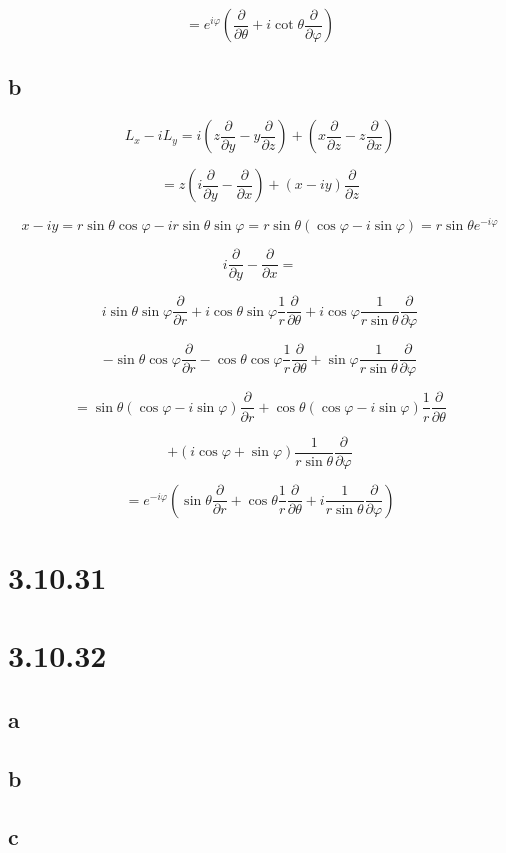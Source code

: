 \documentclass[12pt]{article}
\begin{document}
\[
    = e^{i \varphi} \left(\frac{\partial}{\partial \theta} + i \cot{\theta}\frac{\partial}{\partial \varphi}\right)
\]

\subsection{b}

\[
    L_x - i L_y = i \left(z \frac{\partial}{\partial y} - y \frac{\partial}{\partial z}\right) + \left(x \frac{\partial}{\partial z} - z \frac{\partial}{\partial x}\right)
\]

\[
    = z \left(i \frac{\partial}{\partial y} - \frac{\partial}{\partial x}\right)  + \left(x - i y\right)  \frac{\partial}{\partial z}
\]

\[
    x - i y = r \sin{\theta} \cos{\varphi} - i r \sin{\theta} \sin{\varphi} = r \sin{\theta} \left(\cos{\varphi} - i \sin{\varphi}\right) = r \sin{\theta} e^{-i \varphi}
\]

\[
    i \frac{\partial}{\partial y} - \frac{\partial}{\partial x} =
\]

\[
    i  \sin{\theta} \sin{\varphi} \frac{\partial}{\partial r} + i \cos{\theta} \sin{\varphi} \frac{1}{r} \frac{\partial}{\partial \theta} + i \cos{\varphi} \frac{1}{r \sin{\theta}} \frac{\partial}{\partial \varphi}
\]

\[
    - \sin{\theta} \cos{\varphi} \frac{\partial}{\partial r} - \cos{\theta} \cos{\varphi} \frac{1}{r} \frac{\partial}{\partial \theta} + \sin{\varphi} \frac{1}{r \sin{\theta}} \frac{\partial}{\partial \varphi}
\]

\[
    = \sin{\theta} \left(\cos{\varphi} - i \sin{\varphi}\right) \frac{\partial}{\partial r} + \cos{\theta} \left(\cos{\varphi} - i \sin{\varphi}\right) \frac{1}{r} \frac{\partial}{\partial \theta}
\]

\[
    + \left(i \cos{\varphi} + \sin{\varphi}\right)  \frac{1}{r \sin{\theta}} \frac{\partial}{\partial \varphi}
\]

\[
    = e^{-i \varphi} \left(\sin{\theta} \frac{\partial}{\partial r} + \cos{\theta} \frac{1}{r} \frac{\partial}{\partial \theta} + i \frac{1}{r \sin{\theta}} \frac{\partial}{\partial \varphi}\right)
\]

\section{3.10.31}

\section{3.10.32}

\subsection{a}

\subsection{b}

\subsection{c}
\end{document}
